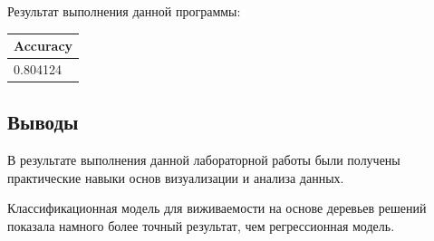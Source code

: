 Результат выполнения данной программы:

\begin{table}[H]
  \begin{tabular}{l}
    \textbf{Accuracy} \\\hline
	0.804124 \\
  \end{tabular}
  \label{tab:main_4_results}
\end{table}

\subsection*{Выводы}
В результате выполнения данной лабораторной работы были получены практические навыки основ визуализации и анализа данных.

Классификационная модель для виживаемости на основе деревьев решений показала намного более точный результат, чем регрессионная модель.


